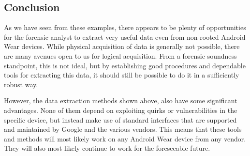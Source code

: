 \documentclass[a4paper,11pt,dvips]{article}
\begin{document}
\subsection{Conclusion}

As we have seen from these examples, there appears to be plenty of opportunities for the forensic analyst to extract very useful data even from non-rooted Android Wear devices. While physical acquisition of data is generally not possible, there are many avenues open to us for logical acquisition. From a forensic soundness standpoint, this is not ideal, but by establishing good procedures and dependable tools for extracting this data, it should still be possible to do it in a sufficiently robust way.

However, the data extraction methods shown above, also have some significant advantages. None of them depend on exploiting quirks or vulnerabilities in the specific device, but instead make use of standard interfaces that are supported and maintained by Google and the various vendors. This means that these tools and methods will most likely work on any Android Wear device from any vendor. They will also most likely continue to work for the foreseeable future.


\newpage
\end{document}
